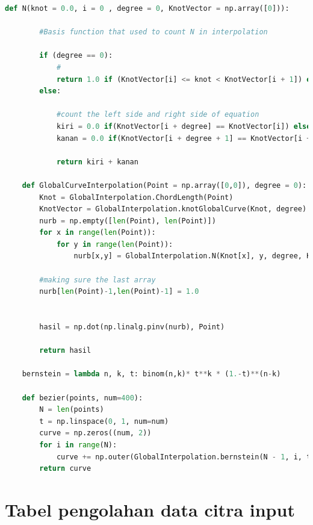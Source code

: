 \begin{lstlisting}[language=Python,basicstyle=\tiny]
    def N(knot = 0.0, i = 0 , degree = 0, KnotVector = np.array([0])):

        #Basis function that used to count N in interpolation

        if (degree == 0):
            #
            return 1.0 if (KnotVector[i] <= knot < KnotVector[i + 1]) else 0.0
        else:
            
            #count the left side and right side of equation
            kiri = 0.0 if(KnotVector[i + degree] == KnotVector[i]) else (knot - KnotVector[i]) / (KnotVector[i + degree] - KnotVector[i]) * GlobalInterpolation.N(knot, i, degree - 1, KnotVector)
            kanan = 0.0 if(KnotVector[i + degree + 1] == KnotVector[i + 1]) else (KnotVector[i + degree + 1] - knot) / (KnotVector[i + degree + 1] - KnotVector[i + 1]) * GlobalInterpolation.N(knot, i + 1, degree - 1, KnotVector)
        
            return kiri + kanan
        
    def GlobalCurveInterpolation(Point = np.array([0,0]), degree = 0):
        Knot = GlobalInterpolation.ChordLength(Point)
        KnotVector = GlobalInterpolation.knotGlobalCurve(Knot, degree)
        nurb = np.empty([len(Point), len(Point)])
        for x in range(len(Point)):
            for y in range(len(Point)):
                nurb[x,y] = GlobalInterpolation.N(Knot[x], y, degree, KnotVector)

        #making sure the last array
        nurb[len(Point)-1,len(Point)-1] = 1.0

       
        hasil = np.dot(np.linalg.pinv(nurb), Point)

        return hasil
    
    bernstein = lambda n, k, t: binom(n,k)* t**k * (1.-t)**(n-k)

    def bezier(points, num=400):
        N = len(points)
        t = np.linspace(0, 1, num=num)
        curve = np.zeros((num, 2))
        for i in range(N):
            curve += np.outer(GlobalInterpolation.bernstein(N - 1, i, t), points[i])
        return curve
\end{lstlisting}


\chapter{Tabel pengolahan data citra input}

